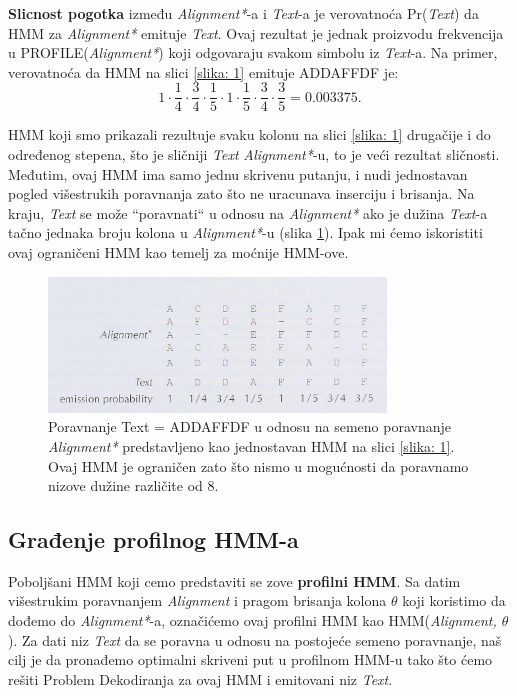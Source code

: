 \textbf{Slicnost pogotka} između \textit{Alignment*}-a i \textit{Text}-a je verovatnoća Pr(\textit{Text}) da HMM za \textit{Alignment*} emituje \textit{Text}. Ovaj rezultat je jednak proizvodu frekvencija u PROFILE(\textit{Alignment*}) koji odgovaraju svakom simbolu iz \textit{Text}-a. Na primer, verovatnoća da HMM na slici \ref{slika: 1} emituje ADDAFFDF je:
\begin{equation}
    1 \cdot \frac{1}{4} \cdot \frac{3}{4} \cdot \frac{1}{5} \cdot 1 \cdot \frac{1}{5} \cdot \frac{3}{4} \cdot \frac{3}{5} = 0.003375.
\end{equation}

HMM koji smo prikazali rezultuje svaku kolonu na slici \ref{slika: 1} drugačije i do određenog stepena, što je sličniji \textit{Text} \textit{Alignment*}-u, to je veći rezultat sličnosti. Međutim, ovaj HMM ima samo jednu skrivenu putanju, i nudi jednostavan pogled višestrukih poravnanja zato što ne uracunava inserciju i brisanja. Na kraju, \textit{Text} se može ``poravnati`` u odnosu na \textit{Alignment*} ako je dužina \textit{Text}-a tačno jednaka broju kolona u \textit{Alignment*}-u (slika \ref{slika: 2}). Ipak mi ćemo iskoristiti ovaj ograničeni HMM kao temelj za moćnije HMM-ove.

\begin{figure}[H]
\centering
\includegraphics[width=0.8\textwidth]{poglavlja/10/slike/slika2.png}
\caption{Poravnanje Text = ADDAFFDF u odnosu na semeno poravnanje \textit{Alignment*} predstavljeno kao jednostavan HMM na slici \ref{slika: 1}. Ovaj HMM je ograničen zato što nismo u mogućnosti da poravnamo nizove dužine različite od 8. }
\label{slika: 2}
\end{figure}

\subsection{Građenje profilnog HMM-a}

Poboljšani HMM koji cemo predstaviti se zove \textbf{profilni HMM}. Sa datim višestrukim poravnanjem \textit{Alignment} i pragom brisanja kolona $\theta$ koji koristimo da dođemo do \textit{Alignment*}-a, označićemo ovaj profilni HMM kao HMM(\textit{Alignment, $\theta$}). Za dati niz \textit{Text} da se poravna u odnosu na postojeće semeno poravnanje, naš cilj je da pronađemo optimalni skriveni put u profilnom HMM-u tako što ćemo rešiti Problem Dekodiranja za ovaj HMM i emitovani niz \textit{Text}.

